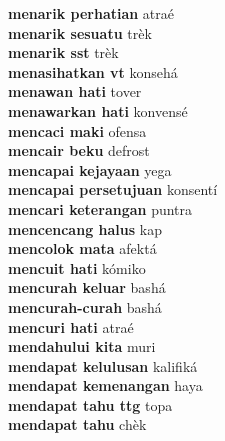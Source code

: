 \textbf{ menarik perhatian  } atraé \\
\textbf{ menarik sesuatu  } trèk \\
\textbf{ menarik sst  } trèk \\
\textbf{ menasihatkan vt  } konsehá \\
\textbf{ menawan hati  } tover \\
\textbf{ menawarkan hati  } konvensé \\
\textbf{ mencaci maki  } ofensa \\
\textbf{ mencair beku  } defrost \\
\textbf{ mencapai kejayaan  } yega \\
\textbf{ mencapai persetujuan  } konsentí \\
\textbf{ mencari keterangan  } puntra \\
\textbf{ mencencang halus  } kap \\
\textbf{ mencolok mata  } afektá \\
\textbf{ mencuit hati  } kómiko \\
\textbf{ mencurah keluar  } bashá \\
\textbf{ mencurah-curah  } bashá \\
\textbf{ mencuri hati  } atraé \\
\textbf{ mendahului kita  } muri \\
\textbf{ mendapat kelulusan  } kalifiká \\
\textbf{ mendapat kemenangan  } haya \\
\textbf{ mendapat tahu ttg  } topa \\
\textbf{ mendapat tahu  } chèk \\
